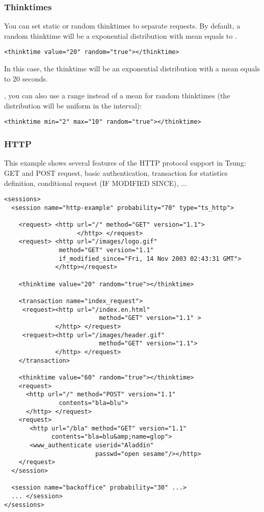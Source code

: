 \documentclass{TSUNG-en}
\begin{document}
\subsubsection{Thinktimes}

You can set static or random thinktimes to separate requests. By
default, a random thinktime will be a exponential distribution with
mean equals to .

\begin{Verbatim}
<thinktime value="20" random="true"></thinktime>
\end{Verbatim}

In this case, the thinktime will be an exponential distribution with a
mean equals to 20 seconds.

, you can also use a range
 instead of a mean for random thinktimes (the
distribution will be uniform in the interval):
\begin{Verbatim}
<thinktime min="2" max="10" random="true"></thinktime>
\end{Verbatim}


\subsubsection{HTTP}


This example shows several features of the HTTP protocol support in
Tsung: GET and POST request, basic authentication, transaction for
statistics definition, conditional request (IF MODIFIED SINCE), ...


\begin{Verbatim}
<sessions>
  <session name="http-example" probability="70" type="ts_http">

    <request> <http url="/" method="GET" version="1.1">
                    </http> </request>
    <request> <http url="/images/logo.gif"
               method="GET" version="1.1"
               if_modified_since="Fri, 14 Nov 2003 02:43:31 GMT">
              </http></request>

    <thinktime value="20" random="true"></thinktime>

    <transaction name="index_request">
     <request><http url="/index.en.html"
                          method="GET" version="1.1" >
              </http> </request>
     <request><http url="/images/header.gif"
                          method="GET" version="1.1">
              </http> </request>
    </transaction>

    <thinktime value="60" random="true"></thinktime>
    <request>
      <http url="/" method="POST" version="1.1"
               contents="bla=blu">
      </http> </request>
    <request>
       <http url="/bla" method="GET" version="1.1"
             contents="bla=blu&amp;name=glop">
       <www_authenticate userid="Aladdin"
                         passwd="open sesame"/></http>
    </request>
  </session>

  <session name="backoffice" probability="30" ...>
  ... </session>
</sessions>
\end{Verbatim}
\end{document}
